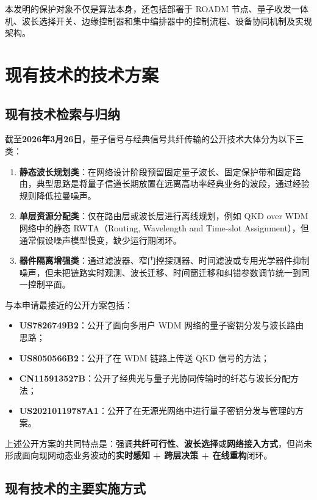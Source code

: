 \documentclass[12pt,a4paper]{article}
\begin{document}
本发明的保护对象不仅是算法本身，还包括部署于 ROADM 节点、量子收发一体机、波长选择开关、边缘控制器和集中编排器中的控制流程、设备协同机制及实现架构。

\section{现有技术的技术方案}

\subsection{现有技术检索与归纳}

截至\textbf{2026年3月26日}，量子信号与经典信号共纤传输的公开技术大体分为以下三类：
\begin{enumerate}[label=(\arabic*)]
    \item \textbf{静态波长规划类}：在网络设计阶段预留固定量子波长、固定保护带和固定路由，典型思路是将量子信道长期放置在远离高功率经典业务的波段，通过经验规则降低拉曼噪声。
    \item \textbf{单层资源分配类}：仅在路由层或波长层进行离线规划，例如 QKD over WDM 网络中的静态 RWTA（Routing, Wavelength and Time-slot Assignment），但通常假设噪声模型慢变，缺少运行期闭环。
    \item \textbf{器件隔离增强类}：通过滤波器、窄门控探测器、时间滤波或专用光学器件抑制噪声，但未把链路实时观测、波长迁移、时间窗迁移和纠错参数调节统一到同一控制平面。
\end{enumerate}

与本申请最接近的公开方案包括：
\begin{itemize}[noitemsep]
    \item \textbf{US7826749B2}：公开了面向多用户 WDM 网络的量子密钥分发与波长路由思路；
    \item \textbf{US8050566B2}：公开了在 WDM 链路上传送 QKD 信号的方法；
    \item \textbf{CN115913527B}：公开了经典光与量子光协同传输时的纤芯与波长分配方法；
    \item \textbf{US20210119787A1}：公开了在无源光网络中进行量子密钥分发与管理的方案。
\end{itemize}

上述公开方案的共同特点是：强调\textbf{共纤可行性}、\textbf{波长选择}或\textbf{网络接入方式}，但尚未形成面向现网动态业务波动的\textbf{实时感知 + 跨层决策 + 在线重构}闭环。

\subsection{现有技术的主要实施方式}
\end{document}

